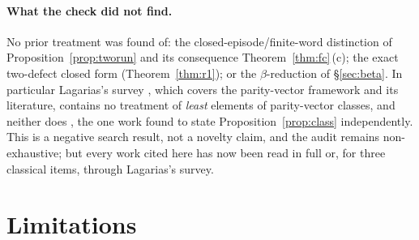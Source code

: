 \documentclass[11pt,a4paper]{article}
\theoremstyle{plain}
\theoremstyle{definition}
\begin{document}
\paragraph{What the check did not find.}
No prior treatment was found of: the closed-episode/finite-word distinction of
Proposition~\ref{prop:tworun} and its consequence Theorem~\ref{thm:fc}\,(c);
the exact two-defect closed form (Theorem~\ref{thm:r1}); or the
$\beta$-reduction of \S\ref{sec:beta}. In particular Lagarias's survey
\cite{lagarias2010}, which covers the parity-vector framework and its
literature, contains no treatment of \emph{least} elements of parity-vector
classes, and neither does \cite{akhtar2026}, the one work found to state
Proposition~\ref{prop:class} independently. This is a negative search result,
not a novelty claim, and the audit remains non-exhaustive; but every work cited
here has now been read in full or, for three classical items, through
Lagarias's survey.

\section{Limitations}\label{sec:limits}
\end{document}
